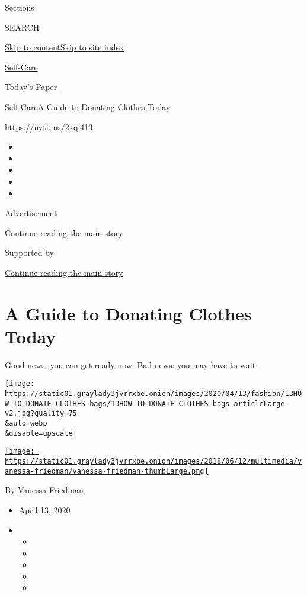 Sections

SEARCH

\protect\hyperlink{site-content}{Skip to
content}\protect\hyperlink{site-index}{Skip to site index}

\href{https://www.nytimes3xbfgragh.onion/section/style/self-care/}{Self-Care}

\href{https://myaccount.nytimes3xbfgragh.onion/auth/login?response_type=cookie\&client_id=vi}{}

\href{https://www.nytimes3xbfgragh.onion/section/todayspaper}{Today's
Paper}

\href{/section/style/self-care/}{Self-Care}\textbar{}A Guide to Donating
Clothes Today

\url{https://nyti.ms/2xqi413}

\begin{itemize}
\item
\item
\item
\item
\item
\end{itemize}

Advertisement

\protect\hyperlink{after-top}{Continue reading the main story}

Supported by

\protect\hyperlink{after-sponsor}{Continue reading the main story}

\hypertarget{a-guide-to-donating-clothes-today}{%
\section{A Guide to Donating Clothes
Today}\label{a-guide-to-donating-clothes-today}}

Good news: you can get ready now. Bad news: you may have to wait.

\texttt{[image: https://static01.graylady3jvrrxbe.onion/images/2020/04/13/fashion/13HOW-TO-DONATE-CLOTHES-bags/13HOW-TO-DONATE-CLOTHES-bags-articleLarge-v2.jpg?quality=75\\\&auto=webp\\\&disable=upscale]}

\href{https://www.nytimes3xbfgragh.onion/by/vanessa-friedman}{\texttt{[image: https://static01.graylady3jvrrxbe.onion/images/2018/06/12/multimedia/vanessa-friedman/vanessa-friedman-thumbLarge.png]}}

By \href{https://www.nytimes3xbfgragh.onion/by/vanessa-friedman}{Vanessa
Friedman}

\begin{itemize}
\item
  April 13, 2020
\item
  \begin{itemize}
  \item
  \item
  \item
  \item
  \item
  \end{itemize}
\end{itemize}

